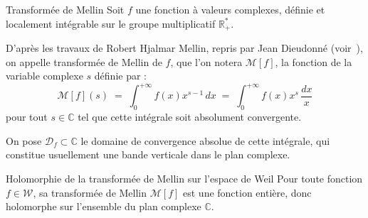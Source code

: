 \documentclass[Riemann_Hypothesis.tex]{subfiles}
\begin{document}
\begin{DefNef}[label=df:TransformeeMellin_fr]{Transformée de Mellin}
    Soit $f$ une fonction à valeurs complexes, définie et localement intégrable sur le groupe multiplicatif $\mathbb{R}_+^*$. \par
    D'après les travaux de Robert Hjalmar 
    {Mellin}, repris par Jean Dieudonné (voir~\cite{Mellin_dieudonne_calcul_infinitesimal}), on appelle transformée de 
    Mellin de $f$, 
    que l'on notera $\mathcal{M}[f]$, la fonction de la variable complexe $s$ définie par :
    \begin{equation*}
        \mathcal{M}[f](s) \;=\; \int_{0}^{+\infty} f(x) x^{s-1} \, dx \;=\; \int_{0}^{+\infty} f(x) x^s \, \frac{dx}{x}
    \end{equation*}
    pour tout $s \in \mathbb{C}$ tel que cette intégrale soit absolument convergente. \par
    On pose $\mathcal{D}_f \subset \mathbb{C}$ le domaine de convergence absolue
    de cette intégrale, qui constitue usuellement une bande verticale dans le
    plan complexe.
\end{DefNef}

\begin{proposition}[label=pr:MellinHolomorpheWeil_fr]{Holomorphie de la transformée de Mellin sur l'espace de Weil}
    Pour toute fonction $f \in \mathcal{W}$, sa transformée de Mellin
    $\mathcal{M}[f]$ est une fonction entière, donc
    holomorphe sur l'ensemble du plan complexe $\mathbb{C}$.
\end{proposition}
\end{document}
